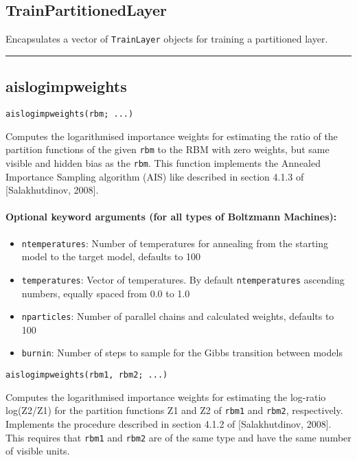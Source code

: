 \subsection*{TrainPartitionedLayer}
Encapsulates a vector of \texttt{TrainLayer} objects for training a partitioned layer.

\noindent\rule{\textwidth}{1pt}
\subsection*{aislogimpweights}
\begin{verbatim}
aislogimpweights(rbm; ...)
\end{verbatim}
Computes the logarithmised importance weights for estimating the ratio of the partition functions of the given \texttt{rbm} to the RBM with zero weights, but same visible and hidden bias as the \texttt{rbm}. This function implements the Annealed Importance Sampling algorithm (AIS) like described in section 4.1.3 of [Salakhutdinov, 2008].

\paragraph*{Optional keyword arguments (for all types of Boltzmann Machines):}
\begin{itemize}
\item \texttt{ntemperatures}: Number of temperatures for annealing from the starting model to the target model, defaults to 100


\item \texttt{temperatures}: Vector of temperatures. By default \texttt{ntemperatures} ascending numbers, equally spaced from 0.0 to 1.0


\item \texttt{nparticles}: Number of parallel chains and calculated weights, defaults to  100


\item \texttt{burnin}: Number of steps to sample for the Gibbs transition between models

\end{itemize}
\begin{verbatim}
aislogimpweights(rbm1, rbm2; ...)
\end{verbatim}
Computes the logarithmised importance weights for estimating the log-ratio log(Z2/Z1) for the partition functions Z1 and Z2 of \texttt{rbm1} and \texttt{rbm2}, respectively. Implements the procedure described in section 4.1.2 of [Salakhutdinov, 2008]. This requires that \texttt{rbm1} and \texttt{rbm2} are of the same type and have the same number of visible units.

